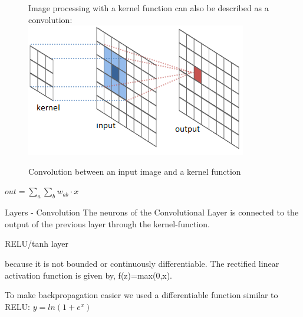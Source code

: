 \documentclass[12pt]{beamer}
\begin{document}
\begin{frame}

\begin{figure}
\centering
Image processing with a kernel function can also be described as a convolution:
\includegraphics[width = 0.4\linewidth]{images/Kernelfunction.png}
\caption{Convolution between an input image and a kernel function}
\label{fig:principle}
\end{figure}

$out = \sum_{a} \sum_{b} w_{ab} \cdot x $



\end{frame}
\begin{frame}{Layers - Convolution}
The neurons of the Convolutional Layer is connected to the output of the previous layer through the kernel-function. 
\end{frame}

\begin{frame}{RELU/tanh layer}

because it is not bounded or continuously differentiable. The rectified linear activation function is given by,
f(z)=max(0,x).

To make backpropagation easier we used a differentiable function similar to RELU: $y = ln(1+e^x)$
\end{frame}
\end{document}
